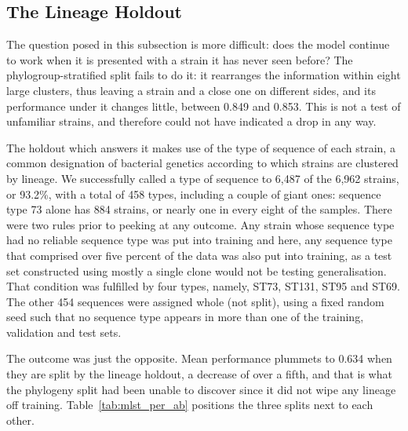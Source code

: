 \documentclass[journal]{IEEEtran}
\begin{document}
\subsection{The Lineage Holdout}
\label{subsec:prevmatch}

The question posed in this subsection is more difficult: does the model continue to
work when it is presented with a strain it has never seen before? The
phylogroup-stratified split fails to do it: it rearranges the information within
eight large clusters, thus leaving a strain and a close one on different sides, and
its performance under it changes little, between 0.849 and 0.853. This is not a test
of unfamiliar strains, and therefore could not have indicated a drop in any way.

The holdout which answers it makes use of the type of sequence of each strain, a
common designation of bacterial genetics according to which strains are clustered by
lineage. We successfully called a type of sequence to 6,487 of the 6,962 strains, or
93.2\%, with a total of 458 types, including a couple of giant ones: sequence
type 73 alone has 884 strains, or nearly one in every eight of the samples. There
were two rules prior to peeking at any outcome. Any strain whose sequence type had no
reliable sequence type was put into training and here, any sequence type that
comprised over five percent of the data was also put into training, as a test set
constructed using mostly a single clone would not be testing generalisation. That
condition was fulfilled by four types, namely, ST73, ST131, ST95 and ST69. The other
454 sequences were assigned whole (not split), using a fixed random seed such that no
sequence type appears in more than one of the training, validation and test sets.

The outcome was just the opposite. Mean performance plummets to 0.634 when they are
split by the lineage holdout, a decrease of over a fifth, and that is what the
phylogeny split had been unable to discover since it did not wipe any lineage off
training. Table~\ref{tab:mlst_per_ab} positions the three splits next to each other.
\end{document}

